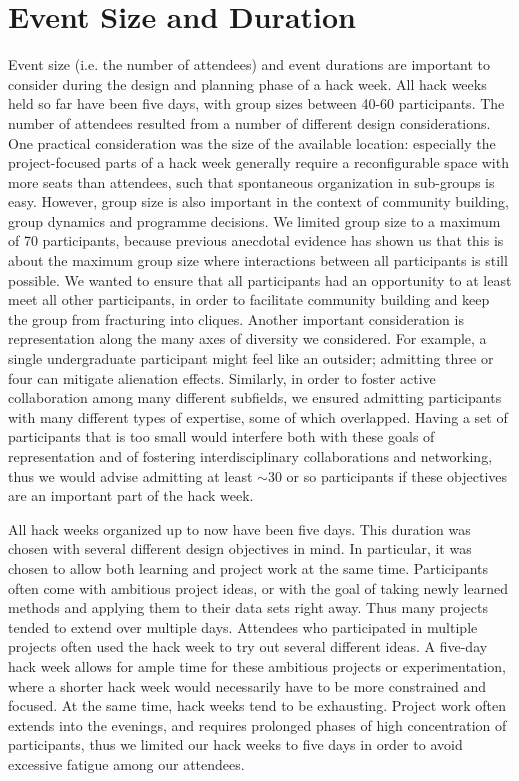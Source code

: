 \documentclass{nature}
\begin{document}
\section{Event Size and Duration}

Event size (i.e. the number of attendees) and event durations are important to consider during the design and planning phase of a hack week. All hack weeks held so far have been five days, with group sizes between 40-60 participants. The number of attendees resulted from a number of different design considerations. One practical consideration was the size of the available location: especially the project-focused parts of a hack week generally require a reconfigurable space with more seats than attendees, such that spontaneous organization in sub-groups is easy. However, group size is also important in the context of community building, group dynamics and programme decisions. We limited group size to a maximum of 70 participants, because previous anecdotal evidence has shown us that this is about the maximum group size where interactions between all participants is still possible. We wanted to ensure that all participants had an opportunity to at least meet all other participants, in order to facilitate community building and keep the group from fracturing into cliques. Another important consideration is representation along the many axes of diversity we considered. For example, a single undergraduate participant might feel like an outsider; admitting three or four can mitigate alienation effects. Similarly, in order to foster active collaboration among many different subfields, we ensured admitting participants with many different types of expertise, some of which overlapped. Having a set of participants that is too small would interfere both with these goals of representation and of fostering interdisciplinary collaborations and networking, thus we would advise admitting at least $\sim$30 or so participants if these objectives are an important part of the hack week.

All hack weeks organized up to now have been five days. This duration was chosen with several different design objectives in mind. In particular, it was chosen to allow both learning and project work at the same time. Participants often come with ambitious project ideas, or with the goal of taking newly learned methods and applying them to their data sets right away. Thus many projects tended to extend over multiple days. Attendees who participated in multiple projects often used the hack week to try out several different ideas. A five-day hack week allows for ample time for these ambitious projects or experimentation, where a shorter hack week would necessarily have to be more constrained and focused. At the same time, hack weeks tend to be exhausting. Project work often extends into the evenings, and requires prolonged phases of high concentration of participants, thus we limited our hack weeks to five days in order to avoid excessive fatigue among our attendees.
\end{document}

